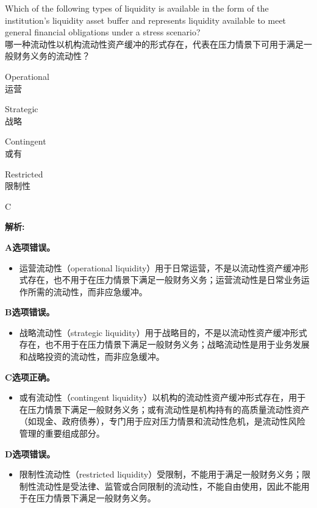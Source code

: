 \documentclass{article}
\newcounter{question} %
\newenvironment{explanation}
{\textbf{解析:}\par}
{\par}
\begin{document}
\begin{question}
    Which of the following types of liquidity is available in the form of the institution's liquidity asset buffer and represents liquidity available to meet general financial obligations under a stress scenario?\\
    哪一种流动性以机构流动性资产缓冲的形式存在，代表在压力情景下可用于满足一般财务义务的流动性？
\end{question}

\begin{choices}
    \item Operational\\
    运营
    \item Strategic\\
    战略
    \item Contingent\\
    或有
    \item Restricted\\
    限制性
\end{choices}

\begin{correctanswer}
    C
\end{correctanswer}

\begin{explanation}
    \textbf{A选项错误。}
    \begin{itemize}
        \item 运营流动性（operational liquidity）用于日常运营，不是以流动性资产缓冲形式存在，也不用于在压力情景下满足一般财务义务；运营流动性是日常业务运作所需的流动性，而非应急缓冲。
    \end{itemize}

    \textbf{B选项错误。}
    \begin{itemize}
        \item 战略流动性（strategic liquidity）用于战略目的，不是以流动性资产缓冲形式存在，也不用于在压力情景下满足一般财务义务；战略流动性是用于业务发展和战略投资的流动性，而非应急缓冲。
    \end{itemize}

    \textbf{C选项正确。}
    \begin{itemize}
        \item 或有流动性（contingent liquidity）以机构的流动性资产缓冲形式存在，用于在压力情景下满足一般财务义务；或有流动性是机构持有的高质量流动性资产（如现金、政府债券），专门用于应对压力情景和流动性危机，是流动性风险管理的重要组成部分。
    \end{itemize}

    \textbf{D选项错误。}
    \begin{itemize}
        \item 限制性流动性（restricted liquidity）受限制，不能用于满足一般财务义务；限制性流动性是受法律、监管或合同限制的流动性，不能自由使用，因此不能用于在压力情景下满足一般财务义务。
    \end{itemize}
\end{explanation}
\end{document}
